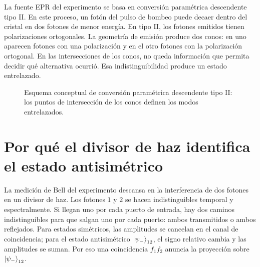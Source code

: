 \documentclass[../main.tex]{subfiles}
\begin{document}
La fuente EPR del experimento se basa en conversión paramétrica descendente tipo II. En este proceso, un fotón del pulso de bombeo puede decaer dentro del cristal en dos fotones de menor energía. En tipo II, los fotones emitidos tienen polarizaciones ortogonales. La geometría de emisión produce dos conos: en uno aparecen fotones con una polarización y en el otro fotones con la polarización ortogonal. En las intersecciones de los conos, no queda información que permita decidir qué alternativa ocurrió. Esa indistinguibilidad produce un estado entrelazado.

\begin{figure}[htbp]
    \centering
    \shorthandoff{<>}
    \caption{Esquema conceptual de conversión paramétrica descendente tipo II: los puntos de intersección de los conos definen los modos entrelazados.}
    \label{fig:tipo-II-conos}
\end{figure}

\section{Por qué el divisor de haz identifica el estado antisimétrico}

La medición de Bell del experimento descansa en la interferencia de dos fotones en un divisor de haz. Los fotones $1$ y $2$ se hacen indistinguibles temporal y espectralmente. Si llegan uno por cada puerto de entrada, hay dos caminos indistinguibles para que salgan uno por cada puerto: ambos transmitidos o ambos reflejados. Para estados simétricos, las amplitudes se cancelan en el canal de coincidencia; para el estado antisimétrico $\ket{\psi_-}_{12}$, el signo relativo cambia y las amplitudes se suman. Por eso una coincidencia $f_1f_2$ anuncia la proyección sobre $\ket{\psi_-}_{12}$.
\end{document}
